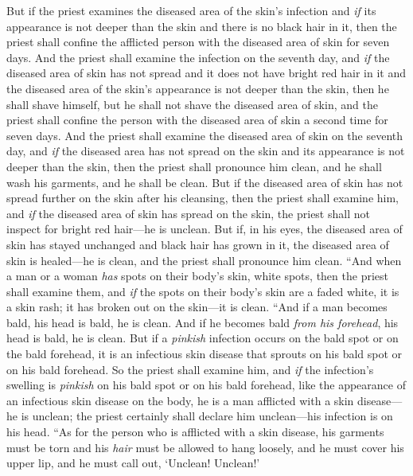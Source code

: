 \begin{biblechapter}
\verse But if the priest examines the diseased area of the skin’s infection and \textit{if} its appearance is not deeper than the skin and there is no black hair in it, then the priest shall confine the afflicted person with the diseased area of skin for seven days.
\verse And the priest shall examine the infection on the seventh day, and \textit{if} the diseased area of skin has not spread and it does not have bright red hair in it and the diseased area of the skin’s appearance is not deeper than the skin,
\verse then he shall shave himself, but he shall not shave the diseased area of skin, and the priest shall confine the person with the diseased area of skin a second time for seven days.
\verse And the priest shall examine the diseased area of skin on the seventh day, and \textit{if} the diseased area has not spread on the skin and its appearance is not deeper than the skin, then the priest shall pronounce him clean, and he shall wash his garments, and he shall be clean.
\verse But if the diseased area of skin has not spread further on the skin after his cleansing,
\verse then the priest shall examine him, and \textit{if} the diseased area of skin has spread on the skin, the priest shall not inspect for bright red hair—he is unclean.
\verse But if, in his eyes, the diseased area of skin has stayed unchanged and black hair has grown in it, the diseased area of skin is healed—he is clean, and the priest shall pronounce him clean.
\verse “And when a man or a woman \textit{has} spots on their body’s skin, white spots,
\verse then the priest shall examine them, and \textit{if} the spots on their body’s skin are a faded white, it is a skin rash; it has broken out on the skin—it is clean.
\verse “And if a man becomes bald, his head is bald, he is clean.
\verse And if he becomes bald \textit{from his forehead}, his head is bald, he is clean.
\verse But if a \textit{pinkish} infection occurs on the bald spot or on the bald forehead, it is an infectious skin disease that sprouts on his bald spot or on his bald forehead.
\verse So the priest shall examine him, and \textit{if} the infection’s swelling is \textit{pinkish} on his bald spot or on his bald forehead, like the appearance of an infectious skin disease on the body,
\verse he is a man afflicted with a skin disease—he is unclean; the priest certainly shall declare him unclean—his infection is on his head.
\verse “As for the person who is afflicted with a skin disease, his garments must be torn and his \textit{hair} must be allowed to hang loosely, and he must cover his upper lip, and he must call out, ‘Unclean! Unclean!’

\end{biblechapter}
